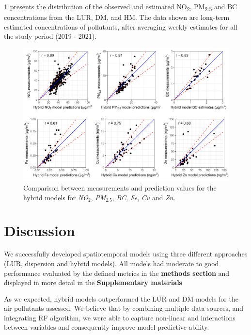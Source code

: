 \documentclass{article}
\begin{document}
\textbf{\cref{fig2}} presents the distribution of the observed and estimated NO\textsubscript{2}, PM\textsubscript{2.5} and BC concentrations from the LUR, DM, and HM. The data shown are long-term estimated concentrations of pollutants, after averaging weekly estimates for all the study period (2019 - 2021).   

\captionsetup[figure]{skip=6pt}
\begin{figure}[!htb]
\includegraphics[width=1.0\textwidth]{figures/fig_HM_test_all_models.png}
\caption{Comparison between measurements and prediction values for the hybrid models for \textit{NO$_2$}, \textit{PM$_{2.5}$}, \textit{BC}, \textit{Fe}, \textit{Cu} and \textit{Zn}.}
\label{fig2}
\end{figure}

\section{Discussion}
We successfully developed spatiotemporal models using three different approaches (LUR, dispersion and hybrid models). All models had moderate to good performance evaluated by the defined metrics in the \textbf{methods section} and displayed in more detail in the \textbf{Supplementary materials}

As we expected, hybrid models outperformed the LUR and DM models for the air pollutants assessed. We believe that by combining multiple data sources, and integrating RF algorithm, we were able to capture non-linear and interactions between variables and consequently improve model predictive ability. 
\end{document}

